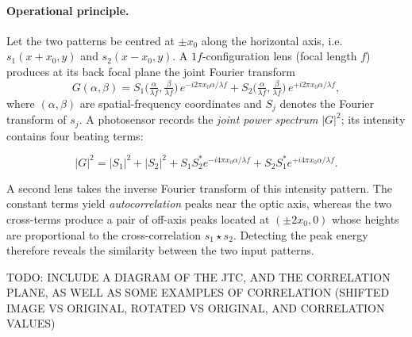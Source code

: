 \documentclass[twocolumn]{article} %
\begin{document}
\paragraph{Operational principle.}
Let the two patterns be centred at \(\pm x_{0}\) along the horizontal
axis, i.e.\ \(s_{1}(x+x_{0},y)\) and \(s_{2}(x-x_{0},y)\).  A
\(1f\)-configuration lens (focal length \(f\)) produces at its back
focal plane the joint Fourier transform
\[
  G(\alpha,\beta)=
    S_{1}\!\bigl(\tfrac{\alpha}{\lambda f},
                 \tfrac{\beta}{\lambda f}\bigr)\,
      e^{-i2\pi x_{0}\alpha/\lambda f}
  + S_{2}\!\bigl(\tfrac{\alpha}{\lambda f},
                 \tfrac{\beta}{\lambda f}\bigr)\,
      e^{+i2\pi x_{0}\alpha/\lambda f},
\]
where \((\alpha,\beta)\) are spatial-frequency coordinates and
\(S_{j}\) denotes the Fourier transform of \(s_{j}\).
A photosensor records the \emph{joint power spectrum}
\(|G|^{2}\); its intensity contains four beating terms:

\[
  |G|^{2}
  =|S_{1}|^{2}+|S_{2}|^{2}
   +S_{1}S_{2}^{\!*}e^{-i4\pi x_{0}\alpha/\lambda f}
   +S_{2}S_{1}^{\!*}e^{+i4\pi x_{0}\alpha/\lambda f}.
\]

A second lens takes the inverse Fourier transform of this intensity
pattern.  The constant terms yield \emph{autocorrelation}
peaks near the optic axis, whereas the two cross-terms produce a pair
of off-axis peaks located at \((\pm2x_{0},0)\) whose heights are
proportional to the cross-correlation
\(s_{1}\star s_{2}\).  Detecting the peak energy therefore reveals the
similarity between the two input patterns.

TODO: INCLUDE A DIAGRAM OF THE JTC, AND THE CORRELATION PLANE, AS WELL AS SOME EXAMPLES OF CORRELATION (SHIFTED IMAGE VS ORIGINAL, ROTATED VS ORIGINAL, AND CORRELATION VALUES)
\end{document}
